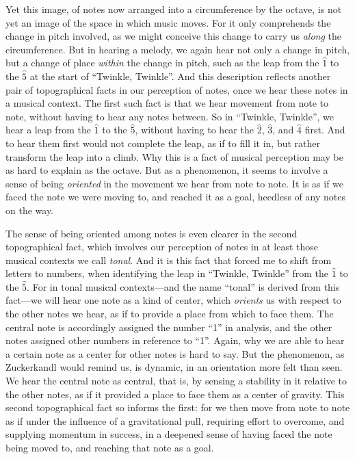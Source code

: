 \documentclass[12pt]{memoir}
\begin{document}
Yet this image, of notes now arranged into a circumference by the
octave, is not yet an image of the space in which music moves. For it
only comprehends the change in pitch involved, as we might conceive this
change to carry us \emph{along} the circumference. But in hearing a
melody, we again hear not only a change in pitch, but a change of place
\emph{within} the change in pitch, such as the leap from the $\hat{1}$ to
the $\hat{5}$ at the start of ``Twinkle, Twinkle''. And this description
reflects another pair of topographical facts in our perception of notes,
once we hear these notes in a musical context. The first such fact is
that we hear movement from note to note, without having to hear any
notes between. So in ``Twinkle, Twinkle'', we hear a leap from the
$\hat{1}$ to the $\hat{5}$, without having to hear the $\hat{2}$, $\hat{3}$, and
$\hat{4}$ first. And to hear them first would not complete the leap, as
if to fill it in, but rather transform the leap into a climb. Why this
is a fact of musical perception may be as hard to explain as the octave.
But as a phenomenon, it seems to involve a sense of being
\emph{oriented} in the movement we hear from note to note. It is as if
we faced the note we were moving to, and reached it as a goal, heedless
of any notes on the way.

The sense of being oriented among notes is even clearer in the second
topographical fact, which involves our perception of notes in at least
those musical contexts we call \emph{tonal}. And it is this fact that
forced me to shift from letters to numbers, when identifying the leap in
``Twinkle, Twinkle'' from the $\hat{1}$ to the $\hat{5}$. For in tonal
musical contexts---and the name ``tonal'' is derived from this fact---we
will hear one note as a kind of center, which \emph{orients} us with
respect to the other notes we hear, as if to provide a place from which
to face them. The central note is accordingly assigned the number
``1'' in analysis, and the other notes assigned other numbers in
reference to ``1''. Again, why we are able to hear a certain note as a
center for other notes is hard to say. But the phenomenon, as
Zuckerkandl would remind us, is dynamic, in an orientation more felt
than seen. We hear the central note as central, that is, by sensing a
stability in it relative to the other notes, as if it provided a place
to face them as a center of gravity. This second topographical fact so
informs the first: for we then move from note to note as if under the
influence of a gravitational pull, requiring effort to overcome, and
supplying momentum in success, in a deepened sense of having faced the
note being moved to, and reaching that note as a goal.
\end{document}
